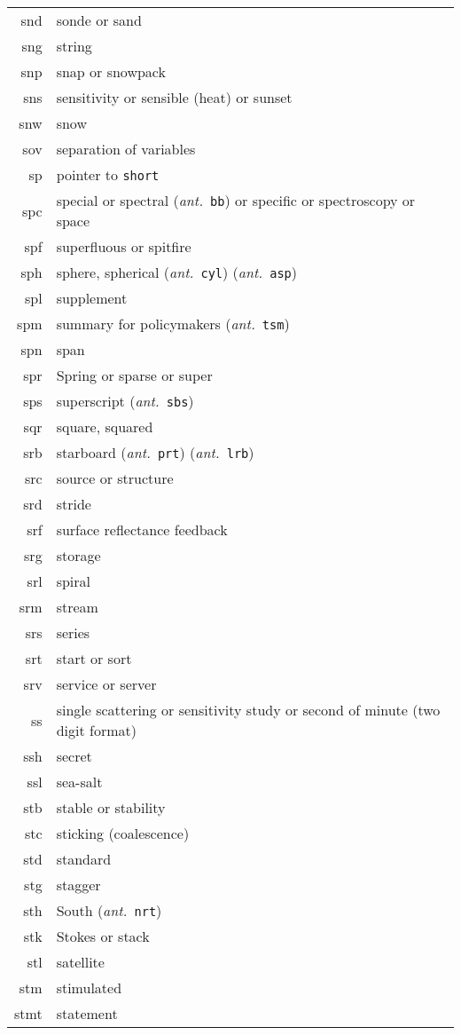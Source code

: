 \documentclass[12pt,twoside]{article}
\newcommand{\ant}[1]{(\textit{ant.}~\texttt{#1})}
\begin{document}
\begin{longtable}[>{\bfseries}l]{>{\ttfamily}r l}
snd & sonde or sand \\
sng & string \\
snp & snap or snowpack \\
sns & sensitivity or sensible (heat) or sunset \\
snw & snow \\
sov & separation of variables \\
sp & pointer to \texttt{short} \\
spc & special or spectral \ant{bb} or specific or spectroscopy or space \\
spf & superfluous or spitfire \\
sph & sphere, spherical \ant{cyl} \ant{asp} \\
spl & supplement \\
spm & summary for policymakers \ant{tsm} \\
spn & span \\
spr & Spring or sparse or super \\
sps & superscript \ant{sbs} \\
sqr & square, squared \\
srb & starboard \ant{prt} \ant{lrb} \\
src & source or structure \\
srd & stride \\
srf & surface reflectance feedback \\
srg & storage \\
srl & spiral \\
srm & stream \\
srs & series \\
srt & start or sort \\
srv & service or server \\
ss & single scattering or sensitivity study or second of minute (two digit format) \\
ssh & secret \\
ssl & sea-salt \\
stb & stable or stability \\
stc & sticking (coalescence) \\
std & standard \\
stg & stagger \\
sth & South \ant{nrt} \\
stk & Stokes or stack \\
stl & satellite \\
stm & stimulated \\
stmt & statement \\

\end{longtable}
\end{document}
